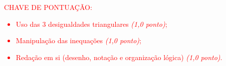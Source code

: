 






















\bigskip

\textcolor{red}{CHAVE DE PONTUAÇÃO:
\begin{itemize}
    \item  Uso das 3 desigualdades triangulares \emph{(1,0 ponto)};
    \item Manipulação das inequações  \emph{(1,0 ponto)};
    \item  Redação em si (desenho, notação e organização lógica) \emph{(1,0 ponto)}.
\end{itemize} }